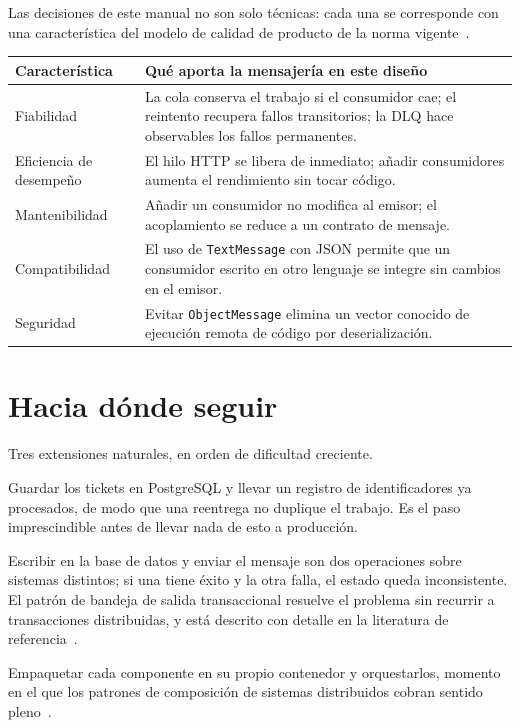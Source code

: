 \documentclass[11pt,a4paper]{book}
\newcommand{\clase}[1]{\texttt{#1}}
\begin{document}
Las decisiones de este manual no son solo técnicas: cada una se corresponde con una característica del modelo de calidad de producto de la norma vigente~\cite{iso25010_2023}.

\begin{center}
	\small
	\begin{tabularx}{\textwidth}{@{}p{3.6cm}X@{}}
		\toprule
		\textbf{Característica} & \textbf{Qué aporta la mensajería en este diseño} \\
		\midrule
		Fiabilidad & La cola conserva el trabajo si el consumidor cae; el reintento recupera fallos transitorios; la DLQ hace observables los fallos permanentes. \\
		Eficiencia de desempeño & El hilo HTTP se libera de inmediato; añadir consumidores aumenta el rendimiento sin tocar código. \\
		Mantenibilidad & Añadir un consumidor no modifica al emisor; el acoplamiento se reduce a un contrato de mensaje. \\
		Compatibilidad & El uso de \clase{TextMessage} con JSON permite que un consumidor escrito en otro lenguaje se integre sin cambios en el emisor. \\
		Seguridad & Evitar \clase{ObjectMessage} elimina un vector conocido de ejecución remota de código por deserialización. \\
		\bottomrule
	\end{tabularx}
\end{center}

\section{Hacia dónde seguir}

Tres extensiones naturales, en orden de dificultad creciente.

\begin{description}[leftmargin=1.6em,style=nextline,itemsep=4pt]
	\item[Persistencia e idempotencia.] Guardar los tickets en PostgreSQL y llevar un registro de identificadores ya procesados, de modo que una reentrega no duplique el trabajo. Es el paso imprescindible antes de llevar nada de esto a producción.
	\item[Transacciones y el patrón \emph{outbox}.] Escribir en la base de datos y enviar el mensaje son dos operaciones sobre sistemas distintos; si una tiene éxito y la otra falla, el estado queda inconsistente. El patrón de bandeja de salida transaccional resuelve el problema sin recurrir a transacciones distribuidas, y está descrito con detalle en la literatura de referencia~\cite{kleppmann2017designing,newman2021microservices}.
	\item[Despliegue distribuido real.] Empaquetar cada componente en su propio contenedor y orquestarlos, momento en el que los patrones de composición de sistemas distribuidos cobran sentido pleno~\cite{burns2024designing}.
\end{description}
\end{document}

